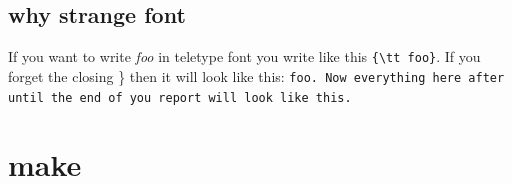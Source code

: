 \documentclass[a4paper,11pt]{article}
\begin{document}
\subsection*{why strange font}

If you want to write {\em foo} in teletype font you write like this
\verb+{\tt foo}+. If you forget the closing \} then it will look like
this: {\tt foo. Now everything here after until the end of you report
  will look like this. }



\section*{make}
\end{document}
